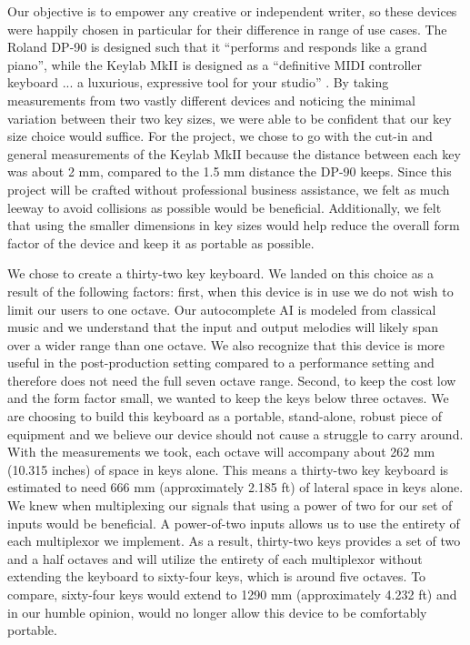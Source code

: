 Our objective is to empower any creative or independent writer, so these devices were happily chosen in particular for their difference in range of use cases. The Roland DP-90 is designed such that it “performs and responds like a grand piano”, while the Keylab MkII is designed as a “definitive MIDI controller keyboard ... a luxurious, expressive tool for your studio” . By taking measurements from two vastly different devices and noticing the minimal variation between their two key sizes, we were able to be confident that our key size choice would suffice. For the project, we chose to go with the cut-in and general measurements of the Keylab MkII because the distance between each key was about 2 mm, compared to the 1.5 mm distance the DP-90 keeps. Since this project will be crafted without professional business assistance, we felt as much leeway to avoid collisions as possible would be beneficial. Additionally, we felt that using the smaller dimensions in key sizes would help reduce the overall form factor of the device and keep it as portable as possible.

We chose to create a thirty-two key keyboard. We landed on this choice as a result of the following factors: first, when this device is in use we do not wish to limit our users to one octave. Our autocomplete AI is modeled from classical music and we understand that the input and output melodies will likely span over a wider range than one octave. We also recognize that this device is more useful in the post-production setting compared to a performance setting and therefore does not need the full seven octave range. Second, to keep the cost low and the form factor small, we wanted to keep the keys below three octaves. We are choosing to build this keyboard as a portable, stand-alone, robust piece of equipment and we believe our device should not cause a struggle to carry around. With the measurements we took, each octave will accompany about 262 mm (10.315 inches) of space in keys alone. This means a thirty-two key keyboard is estimated to need 666 mm (approximately 2.185 ft) of lateral space in keys alone. We knew when multiplexing our signals that using a power of two for our set of inputs would be beneficial. A power-of-two inputs allows us to use the entirety of each multiplexor we implement. As a result, thirty-two keys provides a set of two and a half octaves and will utilize the entirety of each multiplexor without extending the keyboard to sixty-four keys, which is around five octaves. To compare, sixty-four keys would extend to 1290 mm (approximately 4.232 ft) and in our humble opinion, would no longer allow this device to be comfortably portable.

